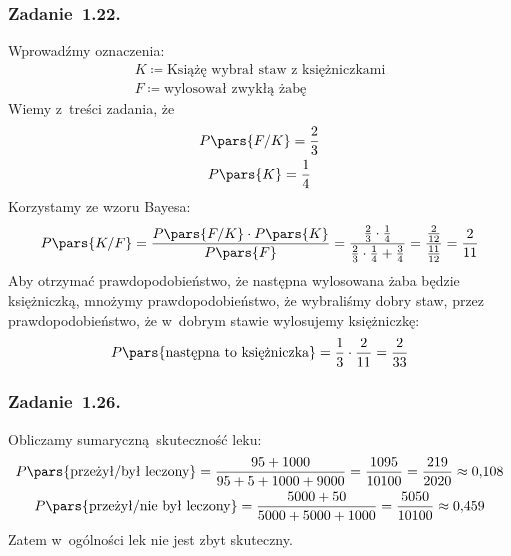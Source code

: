 \subsubsection*{Zadanie~1.22.}
Wprowadźmy oznaczenia:
\begin{gather*}
    K \coloneqq \text{Książę wybrał staw z~księżniczkami}\\
    F \coloneqq \text{wylosował zwykłą żabę}
\end{gather*}
Wiemy z~treści zadania, że
\begin{gather*}
    P\pars{F / K} = \frac{2}{3}\\
    P\pars{K} = \frac{1}{4}
\end{gather*}
Korzystamy ze wzoru Bayesa:
\begin{equation*}
    P\pars{K / F}
    = \frac{P\pars{F / K} \cdot P\pars{K}}{P\pars{F}}
    = \frac{\frac{2}{3} \cdot \frac{1}{4}}{\frac{2}{3} \cdot \frac{1}{4} + \frac{3}{4}}
    = \frac{\frac{2}{12}}{\frac{11}{12}}
    = \frac{2}{11}
\end{equation*}
Aby otrzymać prawdopodobieństwo, że następna wylosowana żaba będzie księżniczką, mnożymy prawdopodobieństwo, że wybraliśmy dobry staw, przez prawdopodobieństwo, że w~dobrym stawie wylosujemy księżniczkę:
\begin{equation*}
    P\pars{\text{następna to księżniczka}}
    = \frac{1}{3} \cdot \frac{2}{11}
    = \frac{2}{33}
\end{equation*}
\subsubsection*{Zadanie~1.26.}
Obliczamy sumaryczną skuteczność leku:
\begin{gather*}
    P\pars{\text{przeżył} / \text{był leczony}}
    = \frac{95 + 1000}{95 + 5 + 1000 + 9000}
    = \frac{1095}{10100}
    = \frac{219}{2020}
    \approx 0{,}108\\
    P\pars{\text{przeżył} / \text{nie był leczony}}
    = \frac{5000 + 50}{5000 + 5000 + 1000}
    = \frac{5050}{10100}
    \approx 0{,}459
\end{gather*}
Zatem w~ogólności lek nie jest zbyt skuteczny.

